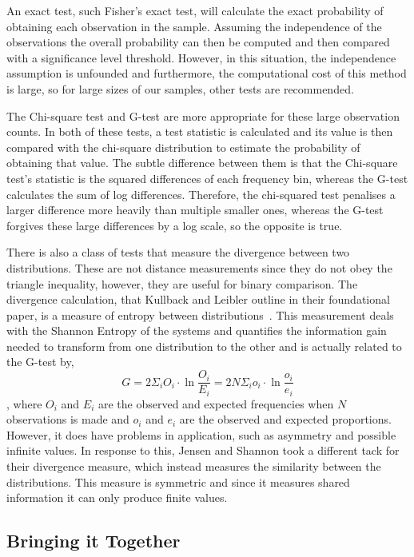 \documentclass[ %
                    author={Samuel Russell},
                supervisor={Prof. Bogdan Warinschi},
                    degree={MEng},
                     title={Innocuous Ciphertexts},
                  subtitle={The DE-CENSOR Scheme},
                      type={research},
                      year={2018} ]{dissertation}
\begin{document}
An exact test, such Fisher's exact test, will calculate the exact probability of obtaining each observation in the sample.
Assuming the independence of the observations the overall probability can then be computed and then compared with a significance level threshold.
However, in this situation, the independence assumption is unfounded and furthermore, the computational cost of this method is large, so for large sizes of our samples, other tests are recommended.

The Chi-square test and G-test are more appropriate for these large observation counts. In both of these tests, a test statistic is calculated and its value is then compared with the chi-square distribution to estimate the probability of obtaining that value.
The subtle difference between them is that the Chi-square test's statistic is the squared differences of each frequency bin, whereas the G-test calculates the sum of log differences.
Therefore, the chi-squared test penalises a larger difference more heavily than multiple smaller ones, whereas the G-test forgives these large differences by a log scale, so the opposite is true.

There is also a class of tests that measure the divergence between two distributions.
These are not distance measurements since they do not obey the triangle inequality, however, they are useful for binary comparison.
The divergence calculation, that Kullback and Leibler outline in their foundational paper, is a measure of entropy between distributions~\cite{dist}.
This measurement deals with the Shannon Entropy of the systems and quantifies the information gain needed to transform from one distribution to the other and is actually related to the G-test by,
$$G = 2 \Sigma_i O_i \cdot \ln{\frac{O_i}{E_i}} = 2N \Sigma_i o_i \cdot \ln{\frac{o_i}{e_i}}$$,
where $O_i$ and $E_i$ are the observed and expected frequencies when $N$ observations is made and $o_i$ and $e_i$ are the observed and expected proportions.
However, it does have problems in application, such as asymmetry and possible infinite values.
In response to this, Jensen and Shannon took a different tack for their divergence measure, which instead measures the similarity between the distributions. This measure is symmetric and since it measures shared information it can only produce finite values.

\subsection{Bringing it Together}
\end{document}

